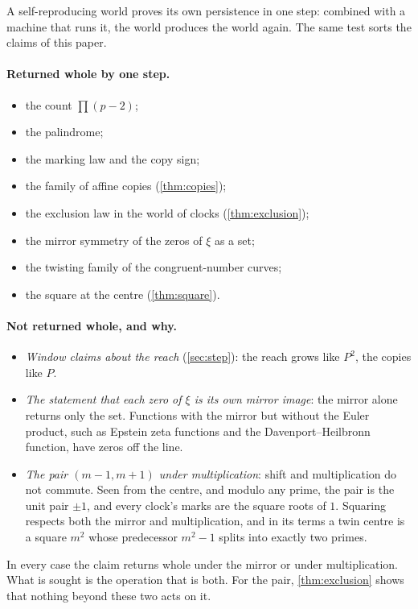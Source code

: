 \documentclass[11pt]{article}
\theoremstyle{definition}\newtheorem{definition}[theorem]{Definition}
\theoremstyle{remark}\newtheorem{remark}[theorem]{Remark}
\begin{document}
A self-reproducing world proves its own persistence in one step: combined with a machine that runs it, the world produces the world again. The same test sorts the claims of this paper.

\paragraph{Returned whole by one step.}
\begin{itemize}
\item the count $\prod(p-2)$;
\item the palindrome;
\item the marking law and the copy sign;
\item the family of affine copies (\cref{thm:copies});
\item the exclusion law in the world of clocks (\cref{thm:exclusion});
\item the mirror symmetry of the zeros of $\xi$ as a set;
\item the twisting family of the congruent-number curves;
\item the square at the centre (\cref{thm:square}).
\end{itemize}

\paragraph{Not returned whole, and why.}
\begin{itemize}
\item \emph{Window claims about the reach} (\cref{sec:step}): the reach grows like $P^2$, the copies like $P$.
\item \emph{The statement that each zero of $\xi$ is its own mirror image}: the mirror alone returns only the set. Functions with the mirror but without the Euler product, such as Epstein zeta functions and the Davenport--Heilbronn function, have zeros off the line.
\item \emph{The pair $(m-1,m+1)$ under multiplication}: shift and multiplication do not commute. Seen from the centre, and modulo any prime, the pair is the unit pair $\pm1$, and every clock's marks are the square roots of $1$. Squaring respects both the mirror and multiplication, and in its terms a twin centre is a square $m^2$ whose predecessor $m^2-1$ splits into exactly two primes.
\end{itemize}

In every case the claim returns whole under the mirror or under multiplication. What is sought is the operation that is both. For the pair, \cref{thm:exclusion} shows that nothing beyond these two acts on it.
\end{document}
